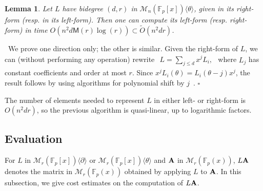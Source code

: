 \documentclass{sig-alternate}
\newcommand{\bigOsoft}{\tilde{O}}
\def\F {\mathbb{F}}
\def\M{\ensuremath{\mathsf{M}}}
\def\mA {\ensuremath{{\bf A}}}
\def\myproof{\noindent{\sc Proof.}~}
\def\foorp{\hfill$\square$}
\newtheorem{Lemma}{Lemma}
\begin{document}
\begin{Lemma}\label{lemma:leftright}
  Let $L$ have bidegree $(d,r)$ in $\mathscr{M}_n(\F_p[x])\langle
  \theta\rangle$, given in its right-form (resp. in its left-form). Then
  \sloppy one can compute its left-form (resp. right-form) in time
  $O(n^2d \M(r)\log(r))\subset \bigOsoft(n^2 dr)$.
\end{Lemma}
\myproof We prove one direction only; the other is similar. Given the
right-form of $L$, we can (without performing any operation) rewrite
$\begin{array}{c}L=\sum_{j \le d} x^j L_i,\end{array}$ where $L_j$ has
constant coefficients and order at most $r$.  Since $x^j L_i(\theta) =
L_i(\theta-j)x^j$, the result follows by using algorithms for
polynomial shift by $j$~\cite{GaGe97}.  \foorp

\smallskip\noindent The number of elements needed to represent $L$ in
either left- or right-form is $O(n^2dr)$, so the previous algorithm is
quasi-linear, up to logarithmic factors.




\subsection{Evaluation}

\noindent For $L$ in $\mathscr{M}_r(\F_p[x])\langle \partial
\rangle$ or $\mathscr{M}_r(\F_p[x])\langle \theta \rangle$ and $\mA$
in $\mathscr{M}_r(\F_p(x))$, $L\mA$ denotes the matrix in
$\mathscr{M}_r(\F_p(x))$ obtained by applying $L$ to $\mA$. In this
subsection, we give cost estimates on the computation of $L\mA$.
\end{document}
